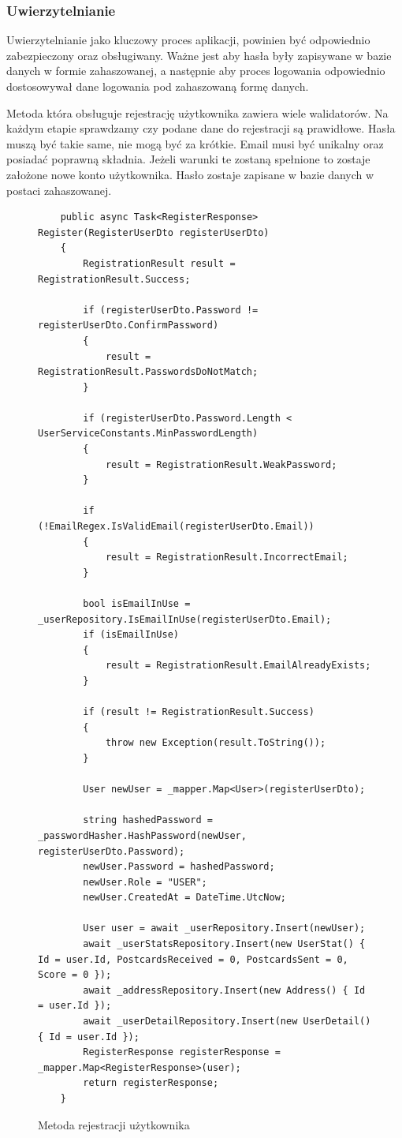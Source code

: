 \documentclass[a4paper,twoside,12pt]{book}
\begin{document}
    
\subsubsection{Uwierzytelnianie}
Uwierzytelnianie jako kluczowy proces aplikacji, powinien być odpowiednio zabezpieczony oraz obsługiwany. Ważne jest aby hasła były zapisywane w bazie danych w formie zahaszowanej, a następnie aby proces logowania odpowiednio dostosowywał dane logowania pod zahaszowaną formę danych.

Metoda która obsługuje rejestrację użytkownika zawiera wiele walidatorów. Na każdym etapie sprawdzamy czy podane dane do rejestracji są prawidłowe. Hasła muszą być takie same, nie mogą być za krótkie. Email musi być unikalny oraz posiadać poprawną składnia. Jeżeli warunki te zostaną spełnione to zostaje założone nowe konto użytkownika. Hasło zostaje zapisane w bazie danych w postaci zahaszowanej. 

    \begin{figure}[H]
        \begin{lstlisting}
    public async Task<RegisterResponse> Register(RegisterUserDto registerUserDto)
    {
        RegistrationResult result = RegistrationResult.Success;

        if (registerUserDto.Password != registerUserDto.ConfirmPassword)
        {
            result = RegistrationResult.PasswordsDoNotMatch;
        }

        if (registerUserDto.Password.Length < UserServiceConstants.MinPasswordLength)
        {
            result = RegistrationResult.WeakPassword;
        }

        if (!EmailRegex.IsValidEmail(registerUserDto.Email))
        {
            result = RegistrationResult.IncorrectEmail;
        }

        bool isEmailInUse = _userRepository.IsEmailInUse(registerUserDto.Email);
        if (isEmailInUse)
        {
            result = RegistrationResult.EmailAlreadyExists;
        }

        if (result != RegistrationResult.Success)
        {
            throw new Exception(result.ToString());
        }

        User newUser = _mapper.Map<User>(registerUserDto);

        string hashedPassword = _passwordHasher.HashPassword(newUser, registerUserDto.Password);
        newUser.Password = hashedPassword;
        newUser.Role = "USER";
        newUser.CreatedAt = DateTime.UtcNow;

        User user = await _userRepository.Insert(newUser);
        await _userStatsRepository.Insert(new UserStat() { Id = user.Id, PostcardsReceived = 0, PostcardsSent = 0, Score = 0 });
        await _addressRepository.Insert(new Address() { Id = user.Id });
        await _userDetailRepository.Insert(new UserDetail() { Id = user.Id });
        RegisterResponse registerResponse = _mapper.Map<RegisterResponse>(user);
        return registerResponse;
    }
        \end{lstlisting}
    \caption{Metoda rejestracji użytkownika}
    \label{fig:pseudokod:listings}
    \end{figure}
\end{document}
